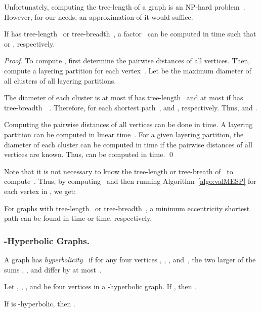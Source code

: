 \documentclass[10pt]{llncs}
\begin{document}
Unfortunately, computing the tree-length of a graph is an NP-hard problem~\cite{Lokshtanov2010}.
However, for our needs, an approximation of it would suffice.

\begin{lemma}
If  has tree-length~ or tree-breadth~, a factor~ can be computed in  time such that  or , respectively.
\end{lemma}

\begin{proof}
To compute , first determine the pairwise distances of all vertices.
Then, compute a layering partition for each vertex~.
Let  be the maximum diameter of all clusters of all layering partitions.

The diameter of each cluster is at most  if  has tree-length~ and at most  if  has tree-breadth~~\cite{DouDraGavYan2007,DraganKohler2014}.
Therefore, for each shortest path~,  and , respectively.
Thus,  and .

Computing the pairwise distances of all vertices can be done in  time.
A layering partition can be computed in linear time~\cite{ChepoiDragan2000}.
For a given layering partition, the diameter of each cluster can be computed in  time if the pairwise distances of all vertices are known.
Thus,  can be computed in  time.
\qed
\end{proof}

Note that it is not necessary to know the tree-length or tree-breath of~ to compute~.
Thus, by computing~ and then running Algorithm~\ref{algo:valMESP} for each vertex in , we get:

\begin{corollary}
For graphs with tree-length~ or tree-breadth~, a minimum eccentricity shortest path can be found in  time or  time, respectively.
\end{corollary}


\subsubsection{-Hyperbolic Graphs.}

A graph has \emph{hyperbolicity}~ if for any four vertices , , , and~, the  two  larger of the sums , , and  differ by at most~.

\begin{lemma}
    \label{lem:deltaHyper}
Let , , , and  be four vertices in a -hyperbolic graph.
If , then .
\end{lemma}

\begin{lemma}
If  is -hyperbolic, then .
\end{lemma}
\end{document}
